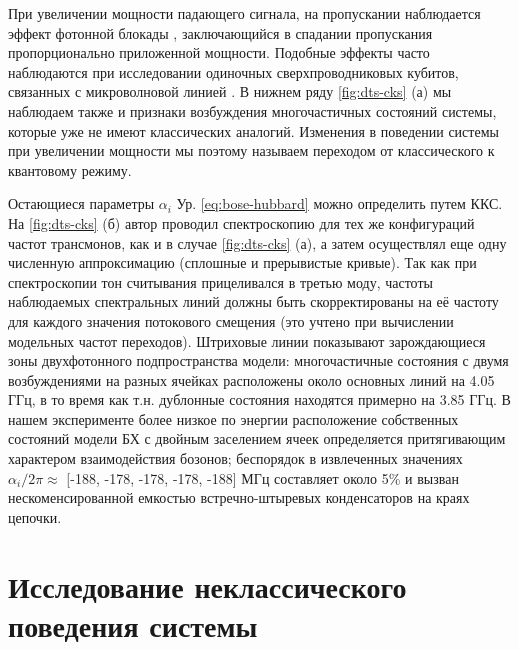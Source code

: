 \documentclass[14pt, a4paper]{extreport}
\numberwithin{equation}{section}
\begin{document}
При увеличении мощности падающего сигнала, на пропускании наблюдается эффект фотонной блокады \cite{birnbaum2005photon}, заключающийся в спадании пропускания пропорционально приложенной мощности. Подобные эффекты часто наблюдаются при исследовании одиночных сверхпроводниковых кубитов, связанных с микроволновой линией \cite{astafiev2010resonance}. В нижнем ряду \autoref{fig:dts-cks} (а) мы наблюдаем также и признаки возбуждения многочастичных состояний системы, которые уже не имеют классических аналогий. Изменения в поведении системы при увеличении мощности мы поэтому называем переходом от классического к квантовому режиму.

Остающиеся параметры $\alpha_i$ Ур. \eqref{eq:bose-hubbard} можно определить путем ККС. На \autoref{fig:dts-cks} (б) автор проводил спектроскопию для тех же конфигураций частот трансмонов, как и в случае \autoref{fig:dts-cks} (а), а затем осуществлял еще одну численную аппроксимацию (сплошные и прерывистые кривые). Так как при спектроскопии тон считывания прицеливался в третью моду, частоты наблюдаемых спектральных линий должны быть скорректированы на её частоту для каждого значения потокового смещения (это учтено при вычислении модельных частот переходов). Штриховые линии показывают зарождающиеся зоны двухфотонного подпространства модели: многочастичные состояния с двумя возбуждениями на разных ячейках расположены около основных линий на 4.05 ГГц, в то время как т.н. дублонные состояния \cite{gorlach2018simulation} находятся примерно на 3.85 ГГц. В нашем эксперименте более низкое по энергии расположение собственных состояний модели БХ с двойным заселением ячеек определяется притягивающим характером взаимодействия бозонов; беспорядок в извлеченных значениях $\alpha_i/2\pi \approx$ [-188, -178, -178, -178, -188] МГц составляет около 5\% и вызван нескоменсированной емкостью встречно-штыревых конденсаторов на краях цепочки. 


\section{Исследование неклассического поведения системы}
\end{document}
